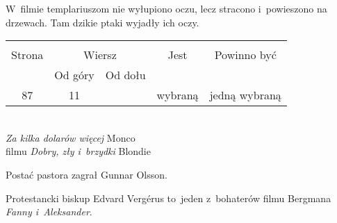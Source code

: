 \documentclass[a4paper,11pt]{article}
\begin{document}
\newpage
{}

\vspace{\spaceThree}





\start {} W~filmie templariuszom nie wyłupiono oczu, lecz
stracono i~powieszono na drzewach. Tam dzikie ptaki wyjadły ich oczy.

\begin{center}
  \begin{tabular}{|c|c|c|c|c|}
    \hline
    & \multicolumn{2}{c|}{} & & \\
    Strona & \multicolumn{2}{c|}{Wiersz} & Jest
                              & Powinno być \\ \cline{2-3}
    & Od góry & Od dołu & & \\
    \hline
    87 & 11 & & wybraną & jedną wybraną \\
    \hline
  \end{tabular}
\end{center}
\noi
{} \\
\Jest \emph{Za kilka dolarów więcej} Monco \\
\Pow filmu \emph{Dobry, zły i~brzydki} Blondie \\

\vspace{\spaceTwo}








\start {} Postać pastora zagrał Gunnar Olsson.

\vspace{\spaceFour}


\start {} Protestancki biskup Edvard Verg\'{e}rus
to~jeden z~bohaterów filmu Bergmana \emph{Fanny i~Aleksander}.
\end{document}
